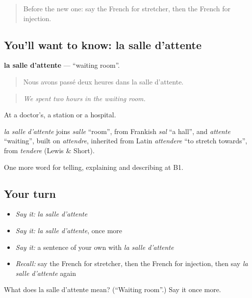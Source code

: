 \label{lesson:FR-C484-salle-d-attente}



\begin{quote}
Before the new one: say the French for stretcher, then the French for injection.
\end{quote}

\subsection*{You'll want to know: la salle d'attente}
\textbf{la salle d'attente} — \textquotedblleft{}waiting room\textquotedblright{}.

\begin{quote}
Nous avons passé deux heures dans la salle d'attente.
\end{quote}

\begin{quote}
\emph{We spent two hours in the waiting room.}
\end{quote}

At a doctor's, a station or a hospital.

\begin{cousinweb}
\emph{la salle d'attente} joins \emph{salle} \textquotedblleft{}room\textquotedblright{}, from Frankish \emph{sal} \textquotedblleft{}a hall\textquotedblright{}, and \emph{attente} \textquotedblleft{}waiting\textquotedblright{}, built on \emph{attendre}, inherited from Latin \emph{attendere} \textquotedblleft{}to stretch towards\textquotedblright{}, from \emph{tendere} (Lewis \& Short).
\end{cousinweb}

\begin{grammarlens}[title={What you've built}]
One more word for telling, explaining and describing at B1.
\end{grammarlens}

\subsection*{Your turn}
\begin{itemize}
\raggedright
  \item \emph{Say it:} \emph{la salle d'attente}
  \item \emph{Say it:} \emph{la salle d'attente}, once more
  \item \emph{Say it:} a sentence of your own with \emph{la salle d'attente}
  \item \emph{Recall:} say the French for stretcher, then the French for injection, then say \emph{la salle d'attente} again
\end{itemize}

\begin{tcolorbox}[breakable,colback=teal!4,colframe=teal!35!black,title={Before you move on}]
What does la salle d'attente mean? (\textquotedblleft{}Waiting room\textquotedblright{}.) Say it once more.
\end{tcolorbox}
